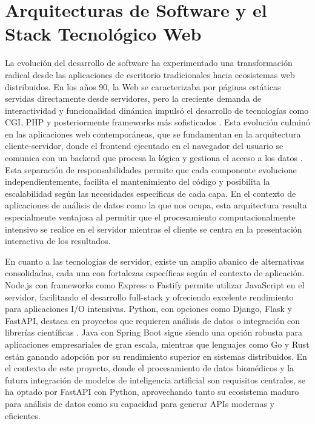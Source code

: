 \section{Arquitecturas de Software y el Stack Tecnológico Web}

La evolución del desarrollo de software ha experimentado una transformación radical desde las aplicaciones de escritorio tradicionales hacia ecosistemas web distribuidos. En los años 90, la Web se caracterizaba por páginas estáticas servidas directamente desde servidores, pero la creciente demanda de interactividad y funcionalidad dinámica impulsó el desarrollo de tecnologías como CGI, PHP y posteriormente frameworks más sofisticados \cite{Ritesh2023_WebEvolution}. Esta evolución culminó en las aplicaciones web contemporáneas, que se fundamentan en la arquitectura cliente-servidor, donde el frontend ejecutado en el navegador del usuario se comunica con un backend que procesa la lógica y gestiona el acceso a los datos \cite{Nyabuto2024_ClientServer}. Esta separación de responsabilidades permite que cada componente evolucione independientemente, facilita el mantenimiento del código y posibilita la escalabilidad según las necesidades específicas de cada capa. En el contexto de aplicaciones de análisis de datos como la que nos ocupa, esta arquitectura resulta especialmente ventajosa al permitir que el procesamiento computacionalmente intensivo se realice en el servidor mientras el cliente se centra en la presentación interactiva de los resultados.

En cuanto a las tecnologías de servidor, existe un amplio abanico de alternativas consolidadas, cada una con fortalezas específicas según el contexto de aplicación. Node.js con frameworks como Express o Fastify permite utilizar JavaScript en el servidor, facilitando el desarrollo full-stack y ofreciendo excelente rendimiento para aplicaciones I/O intensivas. Python, con opciones como Django, Flask y FastAPI, destaca en proyectos que requieren análisis de datos o integración con librerías científicas \cite{Castro2023_PythonDataScience}. Java con Spring Boot sigue siendo una opción robusta para aplicaciones empresariales de gran escala, mientras que lenguajes como Go y Rust están ganando adopción por su rendimiento superior en sistemas distribuidos. En el contexto de este proyecto, donde el procesamiento de datos biomédicos y la futura integración de modelos de inteligencia artificial son requisitos centrales, se ha optado por FastAPI con Python, aprovechando tanto su ecosistema maduro para análisis de datos como su capacidad para generar APIs modernas y eficientes.

